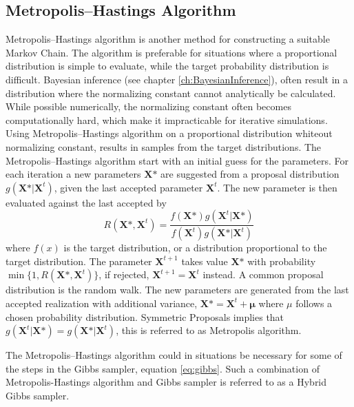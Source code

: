 \subsection{Metropolis–Hastings Algorithm}
Metropolis–Hastings algorithm is another method for constructing a suitable Markov Chain. The algorithm is preferable for situations where a proportional distribution is simple to evaluate, while the target probability distribution is difficult. Bayesian inference (see chapter \ref{ch:BayesianInference}), often result in a distribution where the normalizing constant cannot analytically be calculated. While possible numerically, the normalizing constant often becomes computationally hard, which make it impracticable for iterative simulations. Using Metropolis–Hastings algorithm on a proportional distribution whiteout normalizing constant, results in samples from the target distributions. The Metropolis–Hastings algorithm start with an initial guess for the parameters. For each iteration a new parameters $\boldsymbol{X} \mbox{*}$ are suggested from a proposal distribution $g(\boldsymbol{X} \mbox{*}|\boldsymbol{X}^t)$, given the last accepted parameter $\boldsymbol{X}^t$. The new parameter is then evaluated against the last accepted by
\begin{equation}
\label{eq:MHratio}
R(\boldsymbol{X} \mbox{*},\boldsymbol{X}^{t})=\frac{f(\boldsymbol{X} \mbox{*})g(\boldsymbol{X}^{t}|\boldsymbol{X} \mbox{*})}{f(\boldsymbol{X}^{t})g(\boldsymbol{X} \mbox{*}|\boldsymbol{X}^{t})}
\end{equation}
where $f(x)$ is the target distribution, or a distribution proportional to the target distribution. The parameter $\boldsymbol{X}^{t+1}$ takes value $\boldsymbol{X}\mbox{*}$ with probability $\min\{1,R(\boldsymbol{X} \mbox{*},\boldsymbol{X}^{t})\}$, if rejected, $\boldsymbol{X}^{t+1}=\boldsymbol{X}^t$ instead.
A common proposal distribution is the random walk. The new parameters are generated from the last accepted realization with additional variance, $\boldsymbol{X}\mbox{*}= \boldsymbol{X}^{t} + \boldsymbol{\mu}$ where $\mu$ follows a chosen probability distribution. Symmetric Proposals implies that $ g(\boldsymbol{X}^{t}|\boldsymbol{X} \mbox{*}) = g(\boldsymbol{X} \mbox{*}|\boldsymbol{X}^{t})$, this is referred to as Metropolis algorithm.

The Metropolis–Hastings algorithm could in situations be necessary for some of the steps in the Gibbs sampler, equation \eqref{eq:gibbs}. Such a combination of Metropolis-Hastings algorithm and Gibbs sampler is referred to as a Hybrid Gibbs sampler.  



